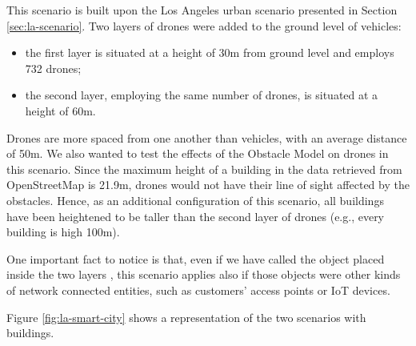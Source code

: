 		
		This scenario is built upon the Los Angeles urban scenario presented in Section \ref{sec:la-scenario}. Two layers of drones were added to the ground level of vehicles: 
		\begin{itemize}
			\item the first layer is situated at a height of 30m from ground level and employs 732 drones;
			\item the second layer, employing the same number of drones, is situated at a height of 60m.
		\end{itemize}
		Drones are more spaced from one another than vehicles, with an average distance of 50m. We also wanted to test the effects of the Obstacle Model on drones in this scenario. Since the maximum height of a building in the data retrieved from OpenStreetMap is 21.9m, drones would not have their line of sight affected by the obstacles. Hence, as an additional configuration of this scenario, all buildings have been heightened to be taller than the second layer of drones (e.g., every building is high 100m). 
		
		
		One important fact to notice is that, even if we have called the object placed inside the two layers , this scenario applies also if those objects were other kinds of network connected entities, such as customers' access points or IoT devices.
		
		Figure \ref{fig:la-smart-city} shows a representation of the two scenarios with buildings.
		
